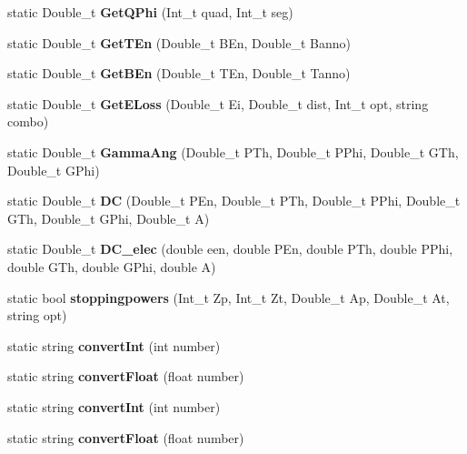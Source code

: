 \begin{DoxyCompactItemize}
\item 
\mbox{\label{classdoppler_ab8fcb952d529bbd30d147bf34f159c73}} 
static Double\+\_\+t {\bfseries Get\+Q\+Phi} (Int\+\_\+t quad, Int\+\_\+t seg)
\item 
\mbox{\label{classdoppler_aec7a929023626e54c17d4c83f2a6d2c3}} 
static Double\+\_\+t {\bfseries Get\+T\+En} (Double\+\_\+t B\+En, Double\+\_\+t Banno)
\item 
\mbox{\label{classdoppler_ad9a413e3272258f7ad88abeb2760bdbc}} 
static Double\+\_\+t {\bfseries Get\+B\+En} (Double\+\_\+t T\+En, Double\+\_\+t Tanno)
\item 
\mbox{\label{classdoppler_a154716ffad9dc13095b9accdd8197e04}} 
static Double\+\_\+t {\bfseries Get\+E\+Loss} (Double\+\_\+t Ei, Double\+\_\+t dist, Int\+\_\+t opt, string combo)
\item 
\mbox{\label{classdoppler_abdefc570d0519bd0e99f9a92d22707de}} 
static Double\+\_\+t {\bfseries Gamma\+Ang} (Double\+\_\+t P\+Th, Double\+\_\+t P\+Phi, Double\+\_\+t G\+Th, Double\+\_\+t G\+Phi)
\item 
\mbox{\label{classdoppler_a4eada56b71bec8f2218c6487431ed3f7}} 
static Double\+\_\+t {\bfseries DC} (Double\+\_\+t P\+En, Double\+\_\+t P\+Th, Double\+\_\+t P\+Phi, Double\+\_\+t G\+Th, Double\+\_\+t G\+Phi, Double\+\_\+t A)
\item 
\mbox{\label{classdoppler_a2d42bc47c077b472a9cbdd500d8092bc}} 
static Double\+\_\+t {\bfseries D\+C\+\_\+elec} (double een, double P\+En, double P\+Th, double P\+Phi, double G\+Th, double G\+Phi, double A)
\item 
\mbox{\label{classdoppler_add47e854c8b41d33ff6054c8daf0d163}} 
static bool {\bfseries stoppingpowers} (Int\+\_\+t Zp, Int\+\_\+t Zt, Double\+\_\+t Ap, Double\+\_\+t At, string opt)
\item 
\mbox{\label{classdoppler_a34a6c6112ce5e719a13a722353c8214f}} 
static string {\bfseries convert\+Int} (int number)
\item 
\mbox{\label{classdoppler_a3148106ce3d9d4861c505dab61ed7aae}} 
static string {\bfseries convert\+Float} (float number)
\item 
\mbox{\label{classdoppler_a34a6c6112ce5e719a13a722353c8214f}} 
static string {\bfseries convert\+Int} (int number)
\item 
\mbox{\label{classdoppler_a3148106ce3d9d4861c505dab61ed7aae}} 
static string {\bfseries convert\+Float} (float number)
\end{DoxyCompactItemize}


